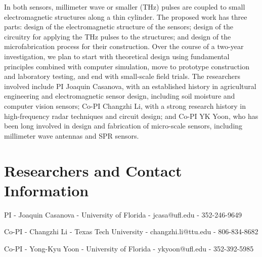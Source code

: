 \documentclass[10pt,letterpaper]{article}
\begin{document}
In both sensors, millimeter wave or smaller (THz) pulses are coupled to small electromagnetic structures along a thin cylinder. The proposed work has three parts: design of the electromagnetic structure of the sensors; design of the circuitry for applying the THz pulses to the structures; and design of the microfabrication process for their construction. Over the course of a two-year investigation, we plan to start with theoretical design using fundamental principles combined with computer simulation, move to prototype construction and laboratory testing, and end with small-scale field trials. The researchers involved include PI Joaquin Casanova, with an established history in agricultural engineering and electromagnetic sensor design, including soil moisture and computer vision sensors; Co-PI Changzhi Li, with a strong research history in high-frequency radar techniques and circuit design; and Co-PI YK Yoon, who has been long involved in design and fabrication of micro-scale sensors, including millimeter wave antennas and SPR sensors. 

\section{Researchers and Contact Information}
\begin{description}
\item{PI} - Joaquin Casanova - University of Florida - jcasa@ufl.edu - 352-246-9649
\item{Co-PI} - Changzhi Li - Texas Tech University - changzhi.li@ttu.edu - 806-834-8682
\item{Co-PI} - Yong-Kyu Yoon -  University of Florida - ykyoon@ufl.edu  - 352-392-5985
\end{description}



  
  
\end{document}
